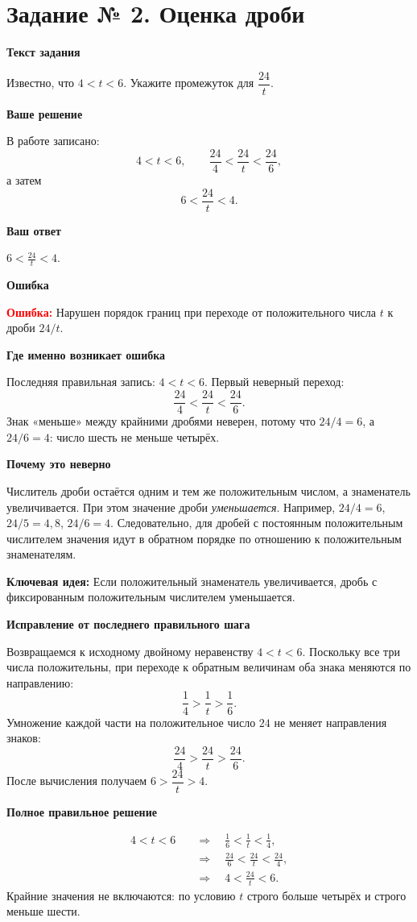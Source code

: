 \documentclass[12pt,a4paper]{article}
\newcommand{\err}{\textcolor{red}{\textbf{Ошибка:}}}
\newcommand{\idea}{\textcolor{blue!60!black}{\textbf{Ключевая идея:}}}
\newcommand{\reviewhead}[1]{\medskip\textbf{#1}\par}
\begin{document}
\newpage
{}\label{task:2}
\section*{Задание № 2. Оценка дроби}
\reviewhead{Текст задания}
Известно, что $4<t<6$. Укажите промежуток для $\dfrac{24}{t}$.

\reviewhead{Ваше решение}
В работе записано:
\[
4<t<6,\qquad
\frac{24}{4}<\frac{24}{t}<\frac{24}{6},
\]
а затем
\[
6<\frac{24}{t}<4.
\]

\reviewhead{Ваш ответ}
$\displaystyle 6<\frac{24}{t}<4$.

\reviewhead{Ошибка}
\err{} Нарушен порядок границ при переходе от положительного числа $t$ к дроби $24/t$.

\reviewhead{Где именно возникает ошибка}
Последняя правильная запись: $4<t<6$. Первый неверный переход:
\[
\frac{24}{4}<\frac{24}{t}<\frac{24}{6}.
\]
Знак «меньше» между крайними дробями неверен, потому что $24/4=6$, а $24/6=4$: число шесть не меньше четырёх.

\reviewhead{Почему это неверно}
Числитель дроби остаётся одним и тем же положительным числом, а знаменатель увеличивается. При этом значение дроби \emph{уменьшается}. Например, $24/4=6$, $24/5=4{,}8$, $24/6=4$. Следовательно, для дробей с постоянным положительным числителем значения идут в обратном порядке по отношению к положительным знаменателям.

\idea{} Если положительный знаменатель увеличивается, дробь с фиксированным положительным числителем уменьшается.

\reviewhead{Исправление от последнего правильного шага}
Возвращаемся к исходному двойному неравенству $4<t<6$. Поскольку все три числа положительны, при переходе к обратным величинам оба знака меняются по направлению:
\[
\frac14>\frac1t>\frac16.
\]
Умножение каждой части на положительное число $24$ не меняет направления знаков:
\[
\frac{24}{4}>\frac{24}{t}>\frac{24}{6}.
\]
После вычисления получаем $6>\dfrac{24}{t}>4$.

\reviewhead{Полное правильное решение}
\begin{align*}
4<t<6
&\quad\Longrightarrow\quad \frac16<\frac1t<\frac14,\\
&\quad\Longrightarrow\quad \frac{24}{6}<\frac{24}{t}<\frac{24}{4},\\
&\quad\Longrightarrow\quad \boxed{4<\frac{24}{t}<6}.
\end{align*}
Крайние значения не включаются: по условию $t$ строго больше четырёх и строго меньше шести.
\end{document}
